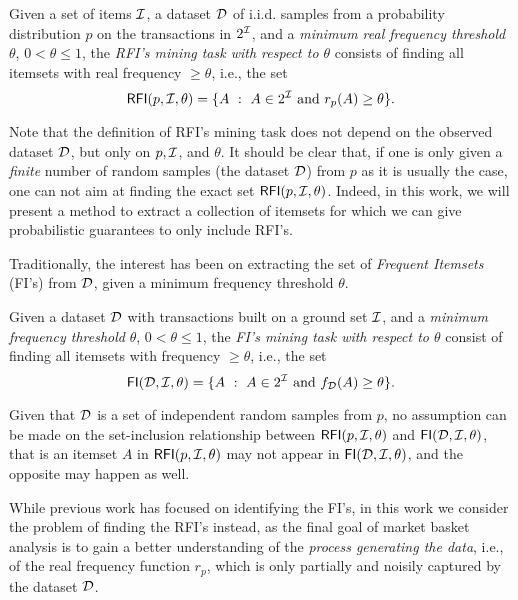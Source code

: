 \begin{definition}\label{def:mineprobthreshold}
  Given a set of items ${\cal I}$, a dataset ${\cal D}$ of i.i.d. samples from a probability distribution $p$ on the transactions
  in $2^{\cal I}$, and a \emph{minimum real frequency threshold} $\theta$, $0<\theta\le 1$,
  the \emph{RFI's mining task with respect to $\theta$} consists of finding all itemsets
  with real frequency $\geq\theta$, i.e., the set 
  \[ \mathsf{RFI}(p,{\cal I},\theta)=\{A ~:~ A \in 2^{\cal I} \mbox{ and } r_p(A)\ge
  \theta\}.\]
\end{definition}
Note that the definition of RFI's mining task does not depend on the observed dataset ${\cal D}$, but only on $p,{\cal I}$, and $\theta$.
It should be clear that, if one is only given a \emph{finite} number of random
samples (the dataset ${\cal D}$) from $p$ as it is usually the case, one can not aim at finding the exact
set $\mathsf{RFI}(p,{\cal I},\theta)$. Indeed, in this work, we will present a method to
extract a collection of itemsets for which we can give probabilistic guarantees
to only include RFI's.

Traditionally, the interest has been on extracting the set of \emph{Frequent
Itemsets} (FI's) from ${\cal D}$, given a minimum frequency threshold $\theta$.
\begin{definition}\label{def:minefreqthreshold}
  Given a dataset ${\cal D}$ with transactions built on a ground set ${\cal I}$, and a
  \emph{minimum frequency threshold} $\theta$, $0<\theta\le 1$, the \emph{FI's
  mining task with respect to $\theta$} consist of finding all itemsets with
  frequency $\geq\theta$, i.e., the set 
  \[ \mathsf{FI}({\cal D},{\cal I},\theta)=\{A ~:~ A \in 2^{\cal I} \mbox{ and } f_{{\cal D}}(A)\ge
  \theta\}.\]
\end{definition}
Given that ${\cal D}$ is a set of independent random samples from $p$, no
assumption can be made on the set-inclusion relationship between
$\mathsf{RFI}(p,{\cal I},\theta)$ and $\mathsf{FI}({\cal D},{\cal I},\theta)$, that is an itemset $A$ in $\mathsf{RFI}(p,{\cal I},\theta)$ may 
not appear in $\mathsf{FI}({\cal D},{\cal I},\theta)$, and the opposite may happen as well.

While previous work has focused on identifying the FI's, in this work we consider the problem of finding the RFI's instead,
as the final goal of market basket analysis is to gain a better
understanding of the \emph{process generating the data}, i.e., of the real
frequency function $r_p$, which is only partially and noisily captured by the
dataset ${\cal D}$.

